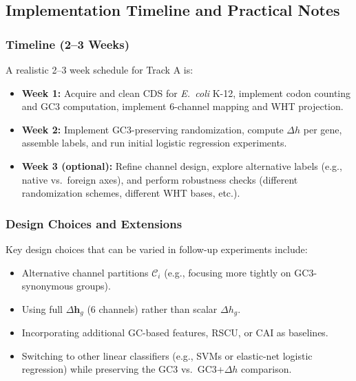 \documentclass[11pt]{article}
\newcommand{\vect}[1]{\bm{#1}}
\begin{document}
\subsection{Implementation Timeline and Practical Notes}

\subsubsection{Timeline (2--3 Weeks)}

A realistic 2--3 week schedule for Track A is:

\begin{itemize}[leftmargin=1.8em]
  \item \textbf{Week 1:} Acquire and clean CDS for \emph{E.~coli} K-12, implement codon counting and GC3 computation, implement 6-channel mapping and WHT projection.
  \item \textbf{Week 2:} Implement GC3-preserving randomization, compute \(\Delta h\) per gene, assemble labels, and run initial logistic regression experiments.
  \item \textbf{Week 3 (optional):} Refine channel design, explore alternative labels (e.g., native vs.\ foreign axes), and perform robustness checks (different randomization schemes, different WHT bases, etc.).
\end{itemize}

\subsubsection{Design Choices and Extensions}

Key design choices that can be varied in follow-up experiments include:

\begin{itemize}[leftmargin=1.8em]
  \item Alternative channel partitions \(\mathcal{C}_i\) (e.g., focusing more tightly on GC3-synonymous groups).
  \item Using full \(\Delta \vect{h}_g\) (6 channels) rather than scalar \(\Delta h_g\).
  \item Incorporating additional GC-based features, RSCU, or CAI as baselines.
  \item Switching to other linear classifiers (e.g., SVMs or elastic-net logistic regression) while preserving the GC3 vs.\ GC3+\(\Delta h\) comparison.
\end{itemize}
\end{document}
